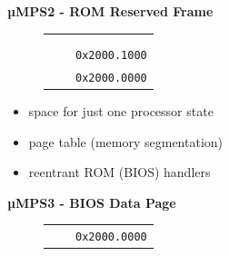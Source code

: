 \documentclass{beamer}
\begin{document}
\begin{frame}
\begin{center}
\begin{minipage}{0.48\textwidth}
\begin{block}{\textbf{{\small µMPS2 - ROM Reserved Frame}}}
\begin{figure}[h]
\begin{tabular}{rcl}
						\multicolumn{1}{l|}{}                                                    & \multicolumn{1}{c|}{\cellcolor{nord13}}                                                      &                                               \\
						\multicolumn{1}{l|}{}                                                    & \multicolumn{1}{c|}{\cellcolor{nord13}}                                                      &                                               \\
						\multicolumn{1}{l|}{}                                                    & \multicolumn{1}{c|}{\cellcolor{nord13}}                                                      & \multirow{2}{*}{\texttt{{\tiny 0x2000.1000}}} \\ \hhline{~-~}
						\multicolumn{1}{l|}{}                                                    & \multicolumn{1}{c|}{\cellcolor{nord12}}                                                      &                                               \\
						\multicolumn{1}{l|}{}                                                    & \multicolumn{1}{c|}{\multirow{-2}{*}{\cellcolor{nord12}{\tiny \textit{ROM Reserved Frame}}}} & \multirow{2}{*}{\texttt{{\tiny 0x2000.0000}}} \\ \hhline{--~}
					\end{tabular}
				\end{figure}
				\begin{scriptsize}
					\begin{itemize}
						\item space for just one processor state
						\item page table (memory segmentation)
						\item reentrant ROM (BIOS) handlers
					\end{itemize}
				\end{scriptsize}
			\end{block}
		\end{minipage}
		\hspace{0pt plus 1 filll}
		\begin{minipage}{0.47\textwidth}
			\begin{block}{\textbf{{\small µMPS3 - BIOS Data Page}}}
				\begin{figure}[h]
					\centering
					\renewcommand{\arraystretch}{0.5}
					\begin{tabular}{rcl}
						                                                                         &                                                                                                & \multirow{2}{*}{\texttt{{\tiny 0x2000.0000}}} \\ \hhline{--~}

\end{tabular}
\end{figure}
\end{block}
\end{minipage}
\end{center}
\end{frame}
\end{document}

